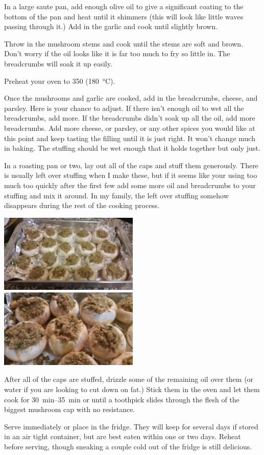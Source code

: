 \begin{recipe}
{		\step In a large saute pan, add enough olive oil to give a significant coating to the bottom of the pan and heat until it shimmers (this will look like little waves passing through it.) Add in the garlic and cook until slightly brown.

		\step Throw in the mushroom stems and cook until the stems are soft and brown. Don't worry if the oil looks like it is far too much to fry so little in. The breadcrumbs will soak it up easily.

		\step Preheat your oven to \SI{350}{\fahrenheit} (\SI{180}{\celsius}).

		\vspace{1em}

		\step Once the mushrooms and garlic are cooked, add in the breadcrumbs, cheese, and parsley. Here is your chance to adjust. If there isn't enough oil to wet all the breadcrumbs, add more. If the breadcrumbs didn’t soak up all the oil, add more breadcrumbs. Add more cheese, or parsley, or any other spices you would like at this point and keep tasting the filling until it is just right. It won't change much in baking. The stuffing should be wet enough that it holds together but only just.

		\step In a roasting pan or two, lay out all of the caps and stuff them generously. There is usually left over stuffing when I make these, but if it seems like your using too much too quickly after the first few add some more oil and breadcrumbs to your stuffing and mix it around. In my family, the left over stuffing somehow disappears during the rest of the cooking process.

		\includegraphics[width=0.5\textwidth]{stuffed_mushrooms/20150728_145435.jpg}%
		\includegraphics[width=0.5\textwidth]{stuffed_mushrooms/20150728_145858.jpg}

		\step After all of the caps are stuffed, drizzle some of the remaining oil over them (or water if you are looking to cut down on fat.) Stick them in the oven and let them cook for \SIrange{30}{35}{\minute} or until a toothpick slides through the flesh of the biggest mushroom cap with no resistance.

		\step Serve immediately or place in the fridge. They will keep for several days if stored in an air tight container, but are best eaten within one or two days. Reheat before serving, though sneaking a couple cold out of the fridge is still delicious.
	}

\end{recipe}